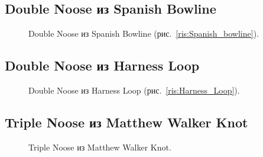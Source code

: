 \subsection{Double Noose из Spanish Bowline}

\begin{figure}[H]\centering
	\begin{minipage}{1\linewidth}
		\begin{center}
			\tcbox[enhanced jigsaw,colframe=black,opacityframe=0.5,opacityback=0.5]
			{\centering{}}
		\end{center}
	\end{minipage}
\caption{Double Noose из Spanish Bowline (рис.~\ref{ris:Spanish_bowline}).}
\label{ris:Double_Noose_1}
\end{figure}

\subsection{Double Noose из Harness Loop}

\begin{figure}[H]\centering
	\begin{minipage}{1\linewidth}
		\begin{center}
			\tcbox[enhanced jigsaw,colframe=black,opacityframe=0.5,opacityback=0.5]
			{\centering{}}
		\end{center}
	\end{minipage}
\caption{Double Noose из Harness Loop (рис.~\ref{ris:Harness_Loop}).}
\label{ris:Double_Noose_3}
\end{figure}

\subsection{Triple Noose из Matthew Walker Knot}

\begin{figure}[H]\centering
	\subfloat[Завязывание]{\label{ris:Triple_Noose_1}
	\tcbox[enhanced jigsaw,colframe=black,opacityframe=0.5,opacityback=0.5,height=6.5cm]
		{\centering
			}
		}
\hfil
	\subfloat[Результат]{\label{ris:Triple_Noose_2}
	\tcbox[enhanced jigsaw,colframe=black,opacityframe=0.5,opacityback=0.5,height=6.5cm]
		{\centering
			}
		}
	\caption{Triple Noose из Matthew Walker Knot.}\label{ris:Triple_Noose}
\end{figure}

